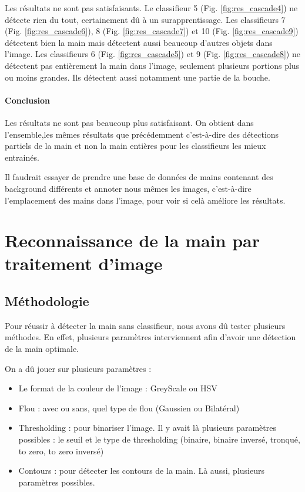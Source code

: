\documentclass[11pt]{article}
\begin{document}
Les résultats ne sont pas satisfaisants. Le classifieur 5 (Fig. \ref{fig:res_cascade4}) ne détecte rien du tout, certainement dû à un surapprentissage. Les classifieurs 7 (Fig. \ref{fig:res_cascade6}), 8 (Fig. \ref{fig:res_cascade7}) et 10 (Fig. \ref{fig:res_cascade9}) détectent bien la main mais détectent aussi beaucoup d'autres objets dans l'image. Les classifieurs 6 (Fig. \ref{fig:res_cascade5}) et 9 (Fig. \ref{fig:res_cascade8}) ne détectent pas entièrement la main dans l'image, seulement plusieurs portions plus ou moins grandes. Ils détectent aussi notamment une partie de la bouche. \bigbreak

\paragraph{Conclusion}
Les résultats ne sont pas beaucoup plus satisfaisant. On obtient dans l'ensemble,les mêmes résultats que précédemment c'est-à-dire des détections partiels de la main et non la main entières pour les classifieurs les mieux entrainés.

Il faudrait essayer de prendre une base de données de mains contenant des background différents et annoter nous mêmes les images, c'est-à-dire l'emplacement des mains dans l'image, pour voir si celà améliore les résultats. \bigbreak

\section{Reconnaissance de la main par traitement d'image}
\subsection{Méthodologie}
Pour réussir à détecter la main sans classifieur, nous avons dû tester plusieurs méthodes. En effet, plusieurs paramètres interviennent afin d'avoir une détection de la main optimale.

On a dû jouer sur plusieurs paramètres :
\begin{itemize}
    \item Le format de la couleur de l'image : GreyScale ou HSV
    \item Flou : avec ou sans, quel type de flou (Gaussien ou Bilatéral)
    \item Thresholding : pour binariser l'image. Il y avait là plusieurs paramètres possibles : le seuil et le type de thresholding (binaire, binaire inversé, tronqué, to zero, to zero inversé)
    \item Contours : pour détecter les contours de la main. Là aussi, plusieurs paramètres possibles.
\end{itemize}
\end{document}
